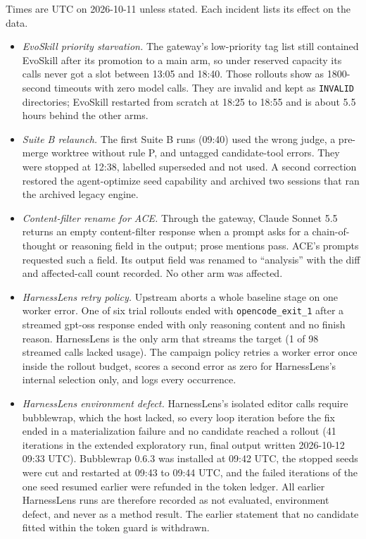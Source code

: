 Times are UTC on 2026-10-11 unless stated. Each incident lists its effect on the data.
\begin{itemize}[leftmargin=*,nosep]
\item \emph{EvoSkill priority starvation.} The gateway's low-priority tag list still contained EvoSkill after its promotion to a main arm, so under reserved capacity its calls never got a slot between 13:05 and 18:40. Those rollouts show as 1800-second timeouts with zero model calls. They are invalid and kept as \texttt{INVALID} directories; EvoSkill restarted from scratch at 18:25 to 18:55 and is about 5.5 hours behind the other arms.
\item \emph{Suite B relaunch.} The first Suite B runs (09:40) used the wrong judge, a pre-merge worktree without rule P, and untagged candidate-tool errors. They were stopped at 12:38, labelled superseded and not used. A second correction restored the agent-optimize seed capability and archived two sessions that ran the archived legacy engine.
\item \emph{Content-filter rename for ACE.} Through the gateway, Claude Sonnet 5.5 returns an empty content-filter response when a prompt asks for a chain-of-thought or reasoning field in the output; prose mentions pass. ACE's prompts requested such a field. Its output field was renamed to ``analysis'' with the diff and affected-call count recorded. No other arm was affected.
\item \emph{HarnessLens retry policy.} Upstream aborts a whole baseline stage on one worker error. One of six trial rollouts ended with \texttt{opencode\_exit\_1} after a streamed gpt-oss response ended with only reasoning content and no finish reason. HarnessLens is the only arm that streams the target (1 of 98 streamed calls lacked usage). The campaign policy retries a worker error once inside the rollout budget, scores a second error as zero for HarnessLens's internal selection only, and logs every occurrence.
\item \emph{HarnessLens environment defect.} HarnessLens's isolated editor calls require bubblewrap, which the host lacked, so every loop iteration before the fix ended in a materialization failure and no candidate reached a rollout (41 iterations in the extended exploratory run, final output written 2026-10-12 09:33 UTC). Bubblewrap 0.6.3 was installed at 09:42 UTC, the stopped seeds were cut and restarted at 09:43 to 09:44 UTC, and the failed iterations of the one seed resumed earlier were refunded in the token ledger. All earlier HarnessLens runs are therefore recorded as not evaluated, environment defect, and never as a method result. The earlier statement that no candidate fitted within the token guard is withdrawn.

\end{itemize}
